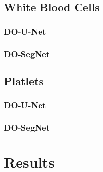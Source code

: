\subsection{White Blood Cells}
\subsubsection{DO-U-Net}



\subsubsection{DO-SegNet}

% 

\subsection{Platlets}
\subsubsection{DO-U-Net}
\subsubsection{DO-SegNet}

% 


\section{Results}
\vspace{0.2in}
\hspace*{0.16in}



